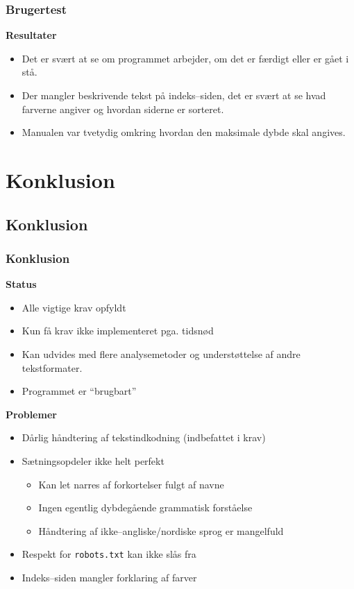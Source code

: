 \documentclass{beamer}
\begin{document}
\begin{frame}
  \frametitle{Brugertest}
  \textbf{Resultater}
  \begin{itemize}
  \item Det er svært at se om programmet arbejder, om det er færdigt
    eller er gået i stå.
  \item Der mangler beskrivende tekst på indeks--siden, det er svært
    at se hvad farverne angiver og hvordan siderne er sorteret.
  \item Manualen var tvetydig omkring hvordan den maksimale dybde skal
    angives.
  \end{itemize}

\end{frame}

\section{Konklusion}
\subsection{Konklusion}
\begin{frame}
  \frametitle{Konklusion}

  \textbf{Status}

  \begin{itemize}
  \item<1-> Alle vigtige krav opfyldt
  \item<2-> Kun få krav ikke implementeret pga. tidsnød
  \item<3-> Kan udvides med flere analysemetoder og understøttelse af
    andre tekstformater.
  \item<4-> Programmet er ``brugbart''
  \end{itemize}
\pause
\pause
\pause
\pause
  \textbf{Problemer}

  \begin{itemize}
  \item<5-> Dårlig håndtering af tekstindkodning (indbefattet i krav)
  \item<6-> Sætningsopdeler ikke helt perfekt
    \begin{itemize}
    \item<6-> Kan let narres af forkortelser fulgt af navne
    \item<6-> Ingen egentlig dybdegående grammatisk forståelse
    \item<6-> Håndtering af ikke--angliske/nordiske sprog er mangelfuld
    \end{itemize}
  \item<7-> Respekt for \texttt{robots.txt} kan ikke slås fra
  \item<7-> Indeks--siden mangler forklaring af farver
  \end{itemize}
\end{frame}
\end{document}
